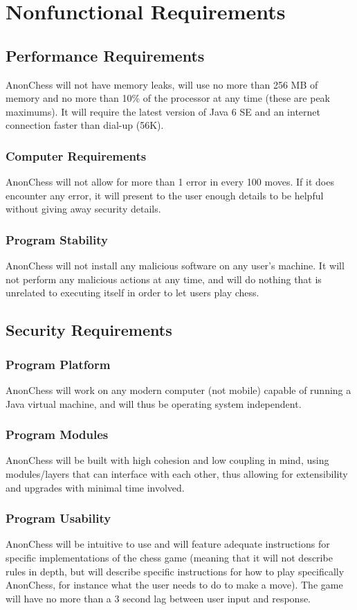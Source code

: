 \section{Nonfunctional Requirements}
\subsection{Performance Requirements}
AnonChess will not have memory leaks, will use no more than 256 MB of memory and no more than 10\% of the processor 
at any time (these are peak maximums). It will require the latest version of Java 6 SE and an internet connection faster 
than dial-up (56K).
\subsubsection{Computer Requirements}
AnonChess will not allow for more than 1 error in every 100 moves. If it does encounter any error, it will present 
to the user enough details to be helpful without giving away security details.
\subsubsection{Program Stability}
AnonChess will not install any malicious software on any user's machine. It will not perform any malicious actions 
at any time, and will do nothing that is unrelated to executing itself in order to let users play chess.
\subsection{Security Requirements}
\subsubsection{Program Platform}
AnonChess will work on any modern computer (not mobile) capable of running a Java virtual machine, and will thus be operating 
system independent.
\subsubsection{Program Modules}
AnonChess will be built with high cohesion and low coupling in mind, using modules/layers that can interface with 
each other, thus allowing for extensibility and upgrades with minimal time involved.
\subsubsection{Program Usability}
AnonChess will be intuitive to use and will feature adequate instructions for specific implementations of the chess 
game (meaning that it will not describe rules in depth, but will describe specific instructions for how to play 
specifically AnonChess, for instance what the user needs to do to make a move). The game will have no more than a 3 
second lag between user input and response.
